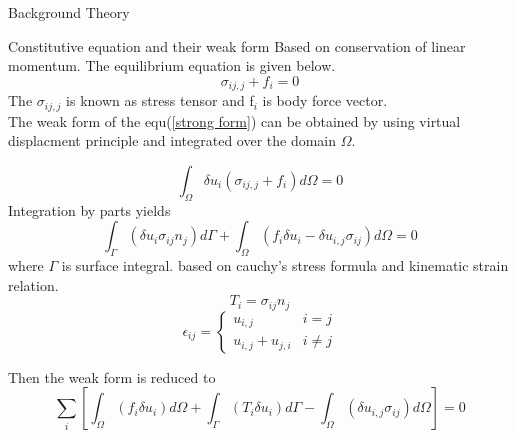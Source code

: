 \documentclass[a4paper,12pt,times]{article}
\begin{document}
\begin{section}{Background Theory}
\begin{subsection}{Constitutive equation and their weak form}
Based on conservation of linear momentum. The equilibrium equation is given below.
\begin{equation}\label{strong form}
\sigma_{i j, j}+f_{i}=0
\end{equation}
The $\sigma_{i j, j}$ is known as stress tensor and f$_{i}$ is body force vector.\\

The weak form of the equ(\ref{strong form}) can be obtained by using virtual displacment principle and integrated over the domain $\Omega$.

\begin{equation}
\int_{\Omega} \delta u_{i}\left(\sigma_{i j, j}+f_{i}\right) d \Omega=0
\end{equation}
Integration by parts yields
\begin{equation}
\int_{\Gamma}\left(\delta u_{i} \sigma_{i j} n_{j}\right) d \Gamma+\int_{\Omega}\left(f_{i} \delta u_{i}-\delta u_{i, j} \sigma_{i j}\right) d \Omega=0
\end{equation}
where $\Gamma$ is surface integral. based on cauchy's stress formula and kinematic strain relation.
\begin{equation}
T_{i}=\sigma_{i j} n_{j}
\end{equation}
\begin{equation}
\epsilon_{i j}=\left\{\begin{array}{ll}
u_{i, j} & i=j \\
u_{i, j}+u_{j, i} & i \neq j
\end{array}\right.
\end{equation}

Then the weak form is reduced to 
\begin{equation}
\sum_{i}\left[\int_{\Omega}\left(f_{i} \delta u_{i}\right) d \Omega+\int_{\Gamma}\left(T_{i} \delta u_{i}\right) d \Gamma-\int_{\Omega}\left(\delta u_{i, j} \sigma_{i j}\right) d \Omega\right]=0
\end{equation}

\end{subsection}


\end{section}
\end{document}
